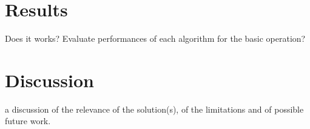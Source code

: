 \documentclass{article}
\begin{document}
\section{Results}
Does it works? Evaluate performances of each algorithm for the basic operation?
\section{Discussion}
a discussion of the relevance of the solution(s), of the limitations and of possible future work.
\end{document}
